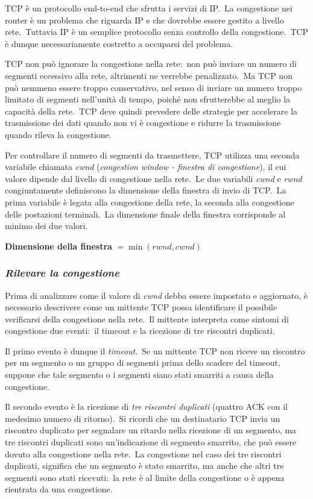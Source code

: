 TCP è un protocollo end-to-end che sfrutta i servizi di IP.\
La congestione nei router è un problema che riguarda IP e che dovrebbe essere gestito a livello rete.\
Tuttavia IP è un semplice protocollo senza controllo della congestione.\
TCP è dunque necessariamente costretto a occuparsi del problema.

TCP non può ignorare la congestione nella rete:\ non può inviare un numero di segmenti eccessivo alla rete, altrimenti ne verrebbe penalizzato.\
Ma TCP non può nemmeno essere troppo conservativo, nel senso di inviare un numero troppo limitato di segmenti nell'unità di tempo, poiché non sfrutterebbe al meglio la capacità della rete.\
TCP deve quindi prevedere delle strategie per accelerare la trasmissione dei dati quando non vi è congestione e ridurre la trasmissione quando rileva la congestione.

Per controllare il numero di segmenti da trasmettere, TCP utilizza una seconda variabile chiamata \emph{cwnd} (\emph{congestion window - finestra di congestione}), il cui valore dipende dal livello di congestione nella rete.\
Le due variabili \emph{cwnd} e \emph{rwnd} congiuntamente definiscono la dimensione della finestra di invio di TCP.\
La prima variabile è legata alla congestione della rete, la seconda alla congestione delle postazioni terminali.\
La dimensione finale della finestra corrisponde al minimo dei due valori.

\begin{center}
    \textbf{Dimensione della finestra} $= \min(rwnd, cwnd)$
\end{center}

\subsubsection{\emph{Rilevare la congestione}}

Prima di analizzare come il valore di \emph{cwnd} debba essere impostato e aggiornato, è necessario descrivere come un mittente TCP possa identificare il possibile verificarsi della congestione nella rete.\
Il mittente interpreta come sintomi di congestione due eventi:\ il timeout e la ricezione di tre riscontri duplicati.

Il primo evento è dunque il \emph{timeout}.\
Se un mittente TCP non riceve un riscontro per un segmento o un gruppo di segmenti prima dello scadere del timeout, suppone che tale segmento o i segmenti siano stati smarriti a causa della congestione.

Il secondo evento è la ricezione di \emph{tre riscontri duplicati} (quattro ACK con il medesimo numero di ritorno).\
Si ricordi che un destinatario TCP invia un riscontro duplicato per segnalare un ritardo nella ricezione di un segmento, ma tre riscontri duplicati sono un'indicazione di segmento smarrito, che può essere dovuto alla congestione nella rete.\
La congestione nel caso dei tre riscontri duplicati, significa che un segmento è stato smarrito, ma anche che altri tre segmenti sono stati ricevuti:\ la rete è al limite della congestione o è appena rientrata da una congestione.

